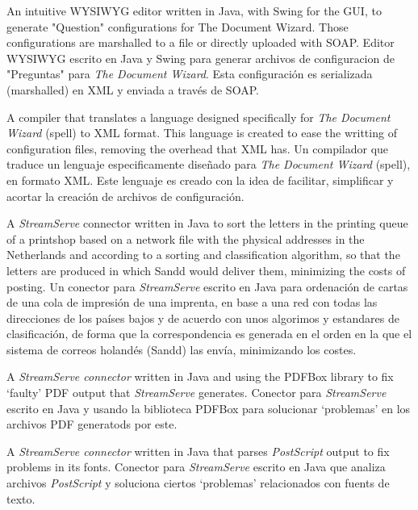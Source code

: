     {\ml
    {An intuitive WYSIWYG editor written in Java, with Swing for the GUI, to
    generate "Question" configurations for The Document Wizard.  Those
    configurations are marshalled to a file or directly uploaded with SOAP.}
    {Editor WYSIWYG escrito en Java y Swing para generar archivos de
    configuracion de "Preguntas" para \textit{The Document Wizard}. Esta
    configuración es serializada (marshalled) en XML y enviada a través de
    SOAP.}
}


    {\ml
    {A compiler that translates a language designed specifically for
    \textit{The Document Wizard} (spell) to XML format. This language is
    created to ease the writting of configuration files, removing the overhead
    that XML has.}
    {Un compilador que traduce un lenguaje especificamente diseñado para
    \textit{The Document Wizard} (spell), en formato XML. Este lenguaje es
    creado con la idea de facilitar, simplificar y acortar la creación de
    archivos de configuración.}
}


    {\ml
    {A \textit{StreamServe} connector written in Java to sort the letters in the
    printing queue of a printshop based on a network file with the physical
    addresses in the Netherlands and according to a sorting and classification
    algorithm, so that the letters are produced in which Sandd would deliver
    them, minimizing the costs of posting.}
    {Un conector para \textit{StreamServe} escrito en Java para ordenación de
    cartas de una cola de impresión de una imprenta, en base a una red con
    todas las direcciones de los países bajos y de acuerdo con unos algorimos y
    estandares de clasificación, de forma que la correspondencia es generada en
    el orden en la que el sistema de correos holandés (Sandd) las envía,
    minimizando los costes.}
}


    {\ml
    {A \textit{StreamServe connector} written in Java and using the PDFBox
    library to fix `faulty' PDF output that \textit{StreamServe} generates.}
    {Conector para \textit{StreamServe} escrito en Java y usando la biblioteca
    PDFBox para solucionar `problemas' en los archivos PDF generatods por
    este.}
}


    {\ml
    {A \textit{StreamServe connector} written in Java that parses
    \textit{PostScript} output to fix problems in its fonts.}
    {Conector para \textit{StreamServe} escrito en Java que analiza archivos
    \textit{PostScript} y soluciona ciertos `problemas' relacionados con fuents
    de texto.}
}

